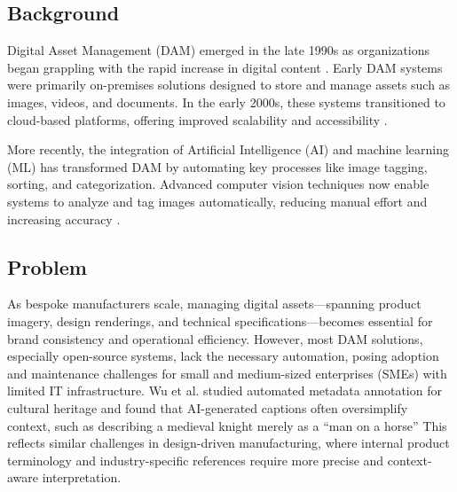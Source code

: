 \documentclass[a4paper,10pt,twocolumn]{article}
\numberwithin{figure}{section}
\numberwithin{table}{section}
\begin{document}
\subsection{Background}
Digital Asset Management (DAM) emerged in the late 1990s as organizations began grappling 
with the rapid increase in digital content \citep{krogh2009}. Early DAM systems were primarily on-premises 
solutions designed to store and manage assets such as images, videos, and documents. 
In the early 2000s, these systems transitioned to cloud-based platforms, offering 
improved scalability and accessibility \citep{mccain2021}.

More recently, the integration of Artificial Intelligence (AI) and machine learning (ML) has transformed 
DAM by automating key processes like image tagging, sorting, and categorization. Advanced computer 
vision techniques now enable systems to analyze and tag images automatically, 
reducing manual effort and increasing accuracy \citep{MINGfANG}.



\subsection{Problem}
As bespoke manufacturers scale, managing digital assets—spanning product imagery, design renderings,
and technical specifications—becomes essential for brand consistency and operational efficiency.
However, most DAM solutions, especially open-source systems, lack the necessary automation, 
posing adoption and maintenance challenges for small and medium-sized enterprises (SMEs) with limited IT infrastructure. 
Wu et al. studied automated metadata annotation for cultural heritage and found that AI-generated 
captions often oversimplify context, such as describing a medieval knight merely as a “man on a horse” \citep{MINGfANG} 
This reflects similar challenges in design-driven manufacturing, where internal product terminology and industry-specific 
references require more precise and context-aware interpretation.
\end{document}
